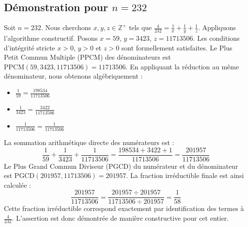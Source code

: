 \documentclass[11pt,a4paper]{article}
\begin{document}
\subsection{Démonstration pour $n = 232$}
Soit $n = 232$. Nous cherchons $x, y, z \in \mathbb{Z}^{+}$ tels que $\frac{4}{232} = \frac{1}{x} + \frac{1}{y} + \frac{1}{z}$.
Appliquons l'algorithme constructif. Posons $x = 59$, $y = 3423$, $z = 11713506$.
Les conditions d'intégrité stricte $x > 0$, $y > 0$ et $z > 0$ sont formellement satisfaites.
Le Plus Petit Commun Multiple (PPCM) des dénominateurs est $\text{PPCM}(59, 3423, 11713506) = 11713506$.
En appliquant la réduction au même dénominateur, nous obtenons algébriquement :
\begin{itemize}
    \item $\frac{1}{59} = \frac{198534}{11713506}$
    \item $\frac{1}{3423} = \frac{3422}{11713506}$
    \item $\frac{1}{11713506} = \frac{1}{11713506}$
\end{itemize}
La sommation arithmétique directe des numérateurs est :
$$ \frac{1}{59} + \frac{1}{3423} + \frac{1}{11713506} = \frac{198534 + 3422 + 1}{11713506} = \frac{201957}{11713506} $$
Le Plus Grand Commun Diviseur (PGCD) du numérateur et du dénominateur est $\text{PGCD}(201957, 11713506) = 201957$.
La fraction irréductible finale est ainsi calculée :
$$ \frac{201957}{11713506} = \frac{201957 \div 201957}{11713506 \div 201957} = \frac{1}{58} $$
Cette fraction irréductible correspond exactement par identification des termes à $\frac{4}{232}$. L'assertion est donc démontrée de manière constructive pour cet entier.
\end{document}
